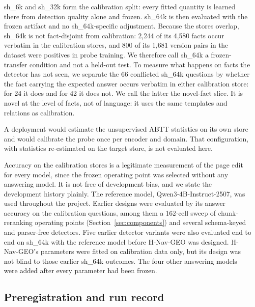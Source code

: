 \documentclass[journal=jcisd8,manuscript=article]{achemso}
\newcommand{\sub}[1]{\textsf{sh\_#1}}                    %
\newcommand{\geo}{H-Nav-GEO}
\begin{document}
\sub{6k} and \sub{32k} form the calibration split: every fitted quantity is learned there from detection quality alone and frozen. \sub{64k} is then evaluated with the frozen artifact and no \sub{64k}-specific adjustment. Because the stores overlap, \sub{64k} is not fact-disjoint from calibration: 2,244 of its 4,580 facts occur verbatim in the calibration stores, and 800 of its 1,681 version pairs in the dataset were positives in probe training. We therefore call \sub{64k} a frozen-transfer condition and not a held-out test. To measure what happens on facts the detector has not seen, we separate the 66 conflicted \sub{64k} questions by whether the fact carrying the expected answer occurs verbatim in either calibration store: for 24 it does and for 42 it does not. We call the latter the novel-fact slice. It is novel at the level of facts, not of language: it uses the same templates and relations as calibration.

A deployment would estimate the unsupervised ABTT statistics on its own store and would calibrate the probe once per encoder and domain. That configuration, with statistics re-estimated on the target store, is not evaluated here.

Accuracy on the calibration stores is a legitimate measurement of the page edit for every model, since the frozen operating point was selected without any answering model. It is not free of development bias, and we state the development history plainly. The reference model, Qwen3-4B-Instruct-2507, was used throughout the project. Earlier designs were evaluated by its answer accuracy on the calibration questions, among them a 162-cell sweep of chunk-reranking operating points (Section~\ref{sec:components}) and several schema-keyed and parser-free detectors. Five earlier detector variants were also evaluated end to end on \sub{64k} with the reference model before \geo{} was designed. \geo{}'s parameters were fitted on calibration data only, but its design was not blind to those earlier \sub{64k} outcomes. The four other answering models were added after every parameter had been frozen.

\subsection{Preregistration and run record}
\label{sec:prereg}
\end{document}

